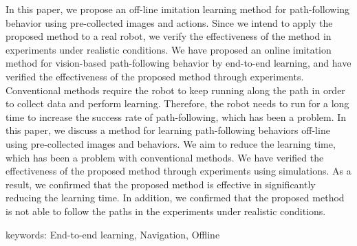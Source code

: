 In this paper, we propose an off-line imitation learning method for path-following behavior using pre-collected images and actions. Since we intend to apply the proposed method to a real robot, we verify the effectiveness of the method in experiments under realistic conditions. We have proposed an online imitation method for vision-based path-following behavior by end-to-end learning, and have verified the effectiveness of the proposed method through experiments. Conventional methods require the robot to keep running along the path in order to collect data and perform learning. Therefore, the robot needs to run for a long time to increase the success rate of path-following, which has been a problem. In this paper, we discuss a method for learning path-following behaviors off-line using pre-collected images and behaviors. We aim to reduce the learning time, which has been a problem with conventional methods. We have verified the effectiveness of the proposed method through experiments using simulations. As a result, we confirmed that the proposed method is effective in significantly reducing the learning time. In addition, we confirmed that the proposed method is not able to follow the paths in the experiments under realistic conditions.

\vspace{10mm}
keywords: End-to-end learning, Navigation, Offline 
